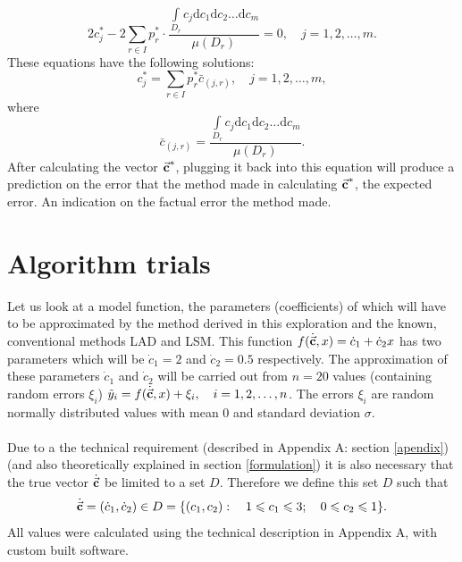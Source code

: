 \begin{equation}
2 c_{j}^{*} - 2 \sum\limits_{r \in I} p_{r}^{*} \cdot \frac{\int\limits_{D_{r}} c_{j}\mathrm{d}c_{1}\mathrm{d}c_{2}\dots\mathrm{d}c_{m}}{\mu(D_{r})} = 0, \quad j = 1,2,\dots,m.
\end{equation}
These equations have the following solutions:
\begin{equation}
c_{j}^{*} = \sum\limits_{r \in I} p_{r}^{*} \bar{c}_{(j,r)}, \quad j = 1,2,\dots,m, \label{eq-solutions-to-cj*}
\end{equation}
where
\begin{equation}
\bar{c}_{(j,r)} = \frac{\int\limits_{D_{r}} c_{j}\mathrm{d}c_{1}\mathrm{d}c_{2}\dots\mathrm{d}c_{m}}{\mu(D_{r})}. \label{eq-cbar}
\end{equation}
After calculating the vector $\vec{\textbf{c}}^*$, plugging it back into this equation will produce a prediction on the error that the method made in calculating $\vec{\textbf{c}}^*$, the expected error. An indication on the factual error the method made.
\section{Algorithm trials}
Let us look at a model function, the parameters (coefficients) of which will have to be approximated by the method derived in this exploration and the known, conventional methods LAD and LSM. This function $f(\dot{\vec{\textbf{c}}},x) = \dot{c}_1 + \dot{c}_2x$ has two parameters which will be $\dot{c}_1=2$ and $\dot{c}_2=0.5$ respectively. The approximation of these parameters $\dot{c}_1$ and $\dot{c}_2$ will be carried out from $n=20$ values (containing random errors $\xi_i$) $\tilde{y}_{i} = f(\dot{\vec{\textbf{c}}},x)+\xi_{i}, \quad i=1,2,\dots,n$. The errors $\xi_i$ are random normally distributed values with mean 0 and standard deviation $\sigma$.\\
\\
Due to a the technical requirement (described in Appendix A: section \vref{apendix}) (and also theoretically explained in section \vref{formulation}) it is also necessary that the true vector $\dot{\vec{\textbf{c}}}$ be limited to a set $D$. Therefore we define this set $D$ such that
\begin{equation}
\dot{\vec{\textbf{c}}} =  (\dot{c}_1 ,\dot{c}_2) \in D = \{ (c_1 ,c_2) : \quad 1 \leqslant c_1 \leqslant 3; \quad 0 \leqslant c_2 \leqslant 1 \}.
\end{equation}
All values were calculated using the technical description in Appendix A, with custom built software.
